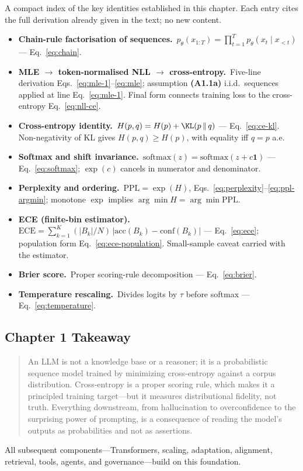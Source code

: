\begin{derivledger}
A compact index of the key identities established in this chapter.
Each entry cites the full derivation already given in the text; no
new content.
\begin{itemize}
  \item \textbf{Chain-rule factorisation of sequences.}\
        $p_\theta(x_{1:T}) = \prod_{t=1}^{T} p_\theta(x_t \mid x_{<t})$
        --- Eq.~\eqref{eq:chain}.
  \item \textbf{MLE $\to$ token-normalised NLL $\to$ cross-entropy.}\
        Five-line derivation Eqs.~\eqref{eq:mle-1}--\eqref{eq:mle};
        assumption \textbf{(A1.1a)} i.i.d.\ sequences applied at line
        Eq.~\eqref{eq:mle-1}. Final form connects training loss to
        the cross-entropy Eq.~\eqref{eq:nll-ce}.
  \item \textbf{Cross-entropy identity.}\
        $H(p,q) = H(p) + \KL(p \,\|\, q)$
        --- Eq.~\eqref{eq:ce-kl}. Non-negativity of KL gives
        $H(p,q) \ge H(p)$, with equality iff $q = p$ a.e.
  \item \textbf{Softmax and shift invariance.}\
        $\mathrm{softmax}(z) = \mathrm{softmax}(z + c \mathbf{1})$
        --- Eq.~\eqref{eq:softmax}; $\exp(c)$ cancels in numerator
        and denominator.
  \item \textbf{Perplexity and ordering.}\
        $\mathrm{PPL} = \exp(H)$, Eqs.~\eqref{eq:perplexity}--\eqref{eq:ppl-argmin};
        monotone $\exp$ implies $\arg\min H = \arg\min \mathrm{PPL}$.
  \item \textbf{ECE (finite-bin estimator).}\
        $\mathrm{ECE} = \sum_{k=1}^{K} (|B_k|/N)\,|\mathrm{acc}(B_k) - \mathrm{conf}(B_k)|$
        --- Eq.~\eqref{eq:ece}; population form Eq.~\eqref{eq:ece-population}.
        Small-sample caveat carried with the estimator.
  \item \textbf{Brier score.}\
        Proper scoring-rule decomposition --- Eq.~\eqref{eq:brier}.
  \item \textbf{Temperature rescaling.}\
        Divides logits by $\tau$ before softmax --- Eq.~\eqref{eq:temperature}.
\end{itemize}
\end{derivledger}

\subsection{Chapter 1 Takeaway}

\begin{quote}
An LLM is not a knowledge base or a reasoner; it is a probabilistic sequence model trained by minimizing cross-entropy against a corpus distribution. Cross-entropy is a proper scoring rule, which makes it a principled training target---but it measures distributional fidelity, not truth. Everything downstream, from hallucination to overconfidence to the surprising power of prompting, is a consequence of reading the model's outputs as probabilities and not as assertions.
\end{quote}

All subsequent components---Transformers, scaling, adaptation, alignment, retrieval, tools, agents, and governance---build on this foundation.
